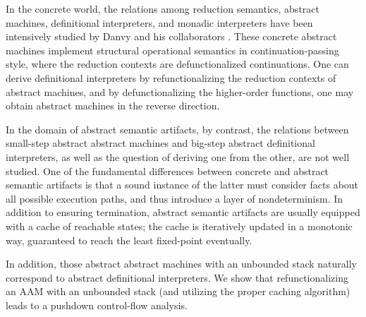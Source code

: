 \documentclass[acmsmall, review]{acmart}\settopmatter{}
\begin{document}
In the concrete world, the relations among reduction semantics, abstract machines,
definitional interpreters, and monadic interpreters have been intensively studied by
Danvy and his collaborators \cite{Ager:2003:FCE:888251.888254, Danvy:2001:DW:773184.773202,
danvy2004refocusing, Danvy:2008:DIP:1411204.1411206, AGER2004223, ager2005functional,
Danvy:2006:RW:2171265.2171268, danvy2009towards, biernacka2009towards}.
These concrete abstract machines implement structural operational semantics in 
continuation-passing style, where the reduction contexts are defunctionalized continuations.
One can derive definitional interpreters by refunctionalizing the reduction contexts of
abstract machines, and by defunctionalizing the higher-order functions, one may obtain
abstract machines in the reverse direction.

In the domain of abstract semantic artifacts, by contrast, the relations between small-step
abstract abstract machines and big-step abstract definitional interpreters, as well as the
question of deriving one from the other, are not well studied.
One of the fundamental differences between concrete and abstract semantic
artifacts is that a sound instance of the latter must consider facts about all possible execution 
paths, and thus introduce a layer of nondeterminism. In addition to ensuring termination, abstract semantic
artifacts are usually equipped with a cache of reachable states; the cache is
iteratively updated in a monotonic way, guaranteed to reach the least fixed-point eventually.

In addition, those abstract abstract machines with an unbounded stack naturally correspond
to abstract definitional interpreters. We show that refunctionalizing an AAM with an
unbounded stack (and utilizing the proper caching algorithm) leads to a pushdown control-flow analysis.
\end{document}
